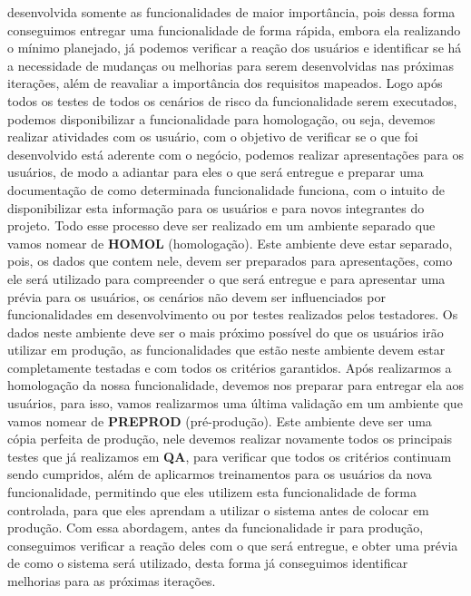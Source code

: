       desenvolvida somente as funcionalidades de maior importância, pois dessa
      forma conseguimos entregar uma funcionalidade de forma rápida, embora ela
      realizando o mínimo planejado, já podemos verificar a reação dos usuários e
      identificar se há a necessidade de mudanças ou melhorias para serem desenvolvidas
      nas próximas iterações, além de reavaliar a importância dos requisitos mapeados.
      \newline
      Logo após todos os testes de todos os cenários de risco da funcionalidade
      serem executados, podemos disponibilizar a funcionalidade para homologação,
      ou seja, devemos realizar atividades com os usuário, com o objetivo de verificar
      se o que foi desenvolvido está aderente com o negócio, podemos realizar
      apresentações para os usuários, de modo a adiantar para eles o que será
      entregue e preparar uma documentação de como determinada funcionalidade
      funciona, com o intuito de disponibilizar esta informação para os usuários e
      para novos integrantes do projeto. Todo esse processo deve ser realizado em
      um ambiente separado que vamos nomear de \textbf{HOMOL} (homologação).
      Este ambiente deve estar separado, pois, os dados que contem nele,
      devem ser preparados para apresentações, como ele será utilizado para
      compreender o que será entregue e para apresentar uma prévia para os usuários,
      os cenários não devem ser influenciados por funcionalidades em desenvolvimento
      ou por testes realizados pelos testadores. Os dados neste ambiente deve ser
      o mais próximo possível do que os usuários irão utilizar em produção, as
      funcionalidades que estão neste ambiente devem estar completamente testadas
      e com todos os critérios garantidos. \newline
      Após realizarmos a homologação da nossa funcionalidade, devemos nos preparar
      para entregar ela aos usuários, para isso, vamos realizarmos uma última validação
      em um ambiente que vamos nomear de \textbf{PREPROD} (pré-produção). Este
      ambiente deve ser uma cópia perfeita de produção, nele devemos realizar novamente
      todos os principais testes que já realizamos em \textbf{QA}, para verificar
      que todos os critérios continuam sendo cumpridos, além de aplicarmos treinamentos
      para os usuários da nova funcionalidade, permitindo que eles utilizem esta
      funcionalidade de forma controlada, para que eles aprendam a utilizar o
      sistema antes de colocar em produção. Com essa abordagem, antes da funcionalidade
      ir para produção, conseguimos verificar a reação deles com o que será entregue,
      e obter uma prévia de como o sistema será utilizado, desta forma já conseguimos
      identificar melhorias para as próximas iterações. \newline

